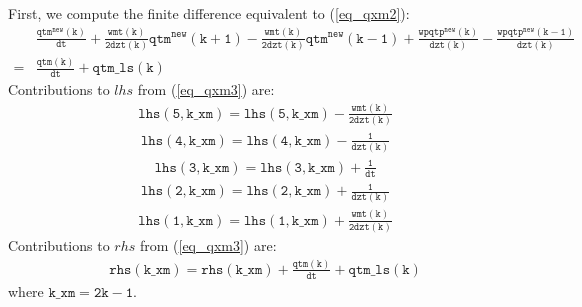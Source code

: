 \documentclass[11pt,fleqn]{article}
\begin{document}
First, we compute
the finite difference equivalent to (\ref{eq_qxm2}):
%
\begin{equation}
\label{eq_qxm3}
\begin{split}
& \mathtt{
   \frac{qtm^{new}(k)}{dt}
   + \frac{wmt(k)}{2dzt(k)} qtm^{new}(k+1)
   - \frac{wmt(k)}{2dzt(k)} qtm^{new}(k-1)
   + \frac{wpqtp^{new}(k)}{dzt(k)}
   - \frac{wpqtp^{new}(k-1)}{dzt(k)} } \\
=& \mathtt{
   \frac{qtm(k)}{dt} + qtm\_ls(k)
  }
\end{split}
\end{equation}
%
Contributions to $lhs$ from (\ref{eq_qxm3}) are:
%
\begin{equation}
\begin{split}
& \mathtt{
  lhs(5,k\_xm) = lhs(5,k\_xm) - \frac{wmt(k)}{2dzt(k)}
  }
\end{split}
\end{equation}
%
\begin{equation}
\begin{split}
& \mathtt{
  lhs(4,k\_xm) = lhs(4,k\_xm) - \frac{1}{dzt(k)}
  }
\end{split}
\end{equation}
%
\begin{equation}
\begin{split}
& \mathtt{
  lhs(3,k\_xm) = lhs(3,k\_xm) + \frac{1}{dt}
  }
\end{split}
\end{equation}
%
\begin{equation}
\begin{split}
& \mathtt{
  lhs(2,k\_xm) = lhs(2,k\_xm) + \frac{1}{dzt(k)}
  }
\end{split}
\end{equation}
%
\begin{equation}
\begin{split}
& \mathtt{
  lhs(1,k\_xm) = lhs(1,k\_xm) + \frac{wmt(k)}{2dzt(k)}
  }
\end{split}
\end{equation}
%
Contributions to $rhs$ from (\ref{eq_qxm3}) are:
%
\begin{equation}
\begin{split}
& \mathtt{
  rhs(k\_xm) = rhs(k\_xm) + \frac{qtm(k)}{dt} + qtm\_ls(k)
  }
\end{split}
\end{equation}
%
where $\mathtt{k\_xm = 2 k - 1}$.
\end{document}

